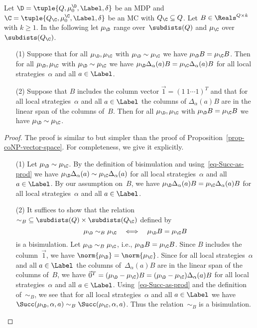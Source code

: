 \begin{prop}\label{prop-coNP-vector-space-MC}
Let $\D = \tuple{Q,\mu^{\D}_{0},\Label,\delta}$ be an MDP
and $\C = \tuple{Q_\C,\mu^{\C}_{0},\Label,\delta}$ be an MC with $Q_\C \subseteq Q$.
Let $B \in \Reals^{Q \times k}$ with $k \ge 1$.
In the following let $\mu_\D$ range over~$\subdists(Q)$ and $\mu_\C$ over~$\subdists(Q_\C)$.
\begin{enumerate}
\item[(1)] Suppose that for all $\mu_\D, \mu_\C$ with $\mu_\D \sim \mu_\C$ we have $\mu_\D B = \mu_\C B$.
    Then for all $\mu_\D, \mu_\C$ with $\mu_\D \sim \mu_\C$ we have $\mu_\D \Delta_{\alpha}(a) B = \mu_\C \Delta_{\alpha}(a) B$ for all local strategies~$\alpha$ and all $a \in \Label$.
\item[(2)] Suppose that $B$ includes the column vector $\vec{1} = {(1 \ 1 \cdots 1)}^T$ and that for all local strategies~$\alpha$ and all $a \in \Label$ the columns of $\Delta_{\alpha}(a) B$ are in the linear span of the columns of~$B$.
    Then for all $\mu_\D, \mu_\C$ with $\mu_\D B = \mu_\C B$ we have $\mu_\D \sim \mu_\C$.
\end{enumerate}
\end{prop}

\begin{proof}
The proof is similar to but simpler than the proof of Proposition~\ref{prop-coNP-vector-space}.
For completeness, we give it explicitly.
\begin{itemize}[align=left]
\item[(1)]
Let $\mu_\D \sim \mu_\C$.
By the definition of bisimulation and using~\eqref{eq-Succ-as-prod} we have $\mu_\D \Delta_{\alpha}(a) \sim \mu_\C \Delta_{\alpha}(a)$ for all local strategies~$\alpha$ and all $a \in \Label$.
By our assumption on~$B$, we have $\mu_\D \Delta_{\alpha}(a) B = \mu_\C \Delta_{\alpha}(a) B$ for all local strategies~$\alpha$ and all $a \in \Label$.
\item[(2)]
It suffices to show that the relation $\mathord{\sim_B} \subseteq \subdists(Q) \times \subdists(Q_\C)$ defined by
\[
 \mu_\D \sim_B \mu_\C \quad \Longleftrightarrow \quad \mu_\D B = \mu_\C B
\]
is a bisimulation.
Let $\mu_\D \sim_B \mu_\C$, i.e., $\mu_\D B = \mu_\C B$.
Since $B$ includes the column~$\vec{1}$, we have $\norm{\mu_\D} = \norm{\mu_\C}$.
Since for all local strategies~$\alpha$ and all $a \in \Label$ the columns of~$\Delta_{\alpha}(a) B$ are in the linear span of the columns of~$B$, we have $\vec{0}^T = (\mu_\D - \mu_\C) B = (\mu_\D - \mu_\C) \Delta_{\alpha}(a) B$ for all local strategies~$\alpha$ and all $a \in \Label$.
Using~\eqref{eq-Succ-as-prod} and the definition of~$\mathord{\sim_B}$, we see that
for all local strategies~$\alpha$ and all $a \in \Label$ we have $\Succ(\mu_\D, \alpha, a) \sim_B \Succ(\mu_\C, \alpha, a)$.
Thus the relation~$\mathord{\sim_B}$ is a bisimulation. \qedhere
\end{itemize}
\end{proof}

